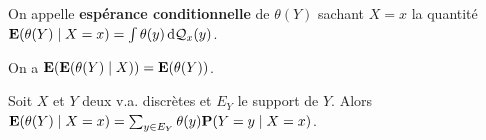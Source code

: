 \begin{defn}
	On appelle \textbf{espérance conditionnelle} de $\theta(Y)$ sachant $X = x$ la quantité $\mathbf{E}(\theta(Y) \mid X = x) = \int \theta(y) \mathop{}\mathopen{}\mathrm{d} \mathcal{Q}_x(y)$.
\end{defn}

\begin{pop}
	On a $\mathbf{E}(\mathbf{E}(\theta(Y) \mid X)) = \mathbf{E}(\theta(Y))$.
\end{pop}

\begin{thm}
	Soit $X$ et $Y$ deux v.a. discrètes et $E_Y$ le support de $Y$.
	Alors $\mathbf{E}(\theta(Y) \mid X = x) = \sum_{y \in E_Y} \theta(y) \mathbf{P}(Y = y \mid X = x)$.
\end{thm}